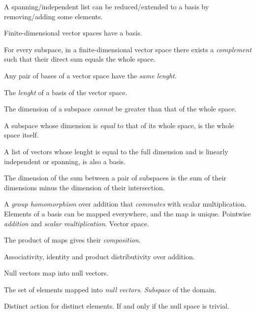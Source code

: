 \begin{multicols}{3}
  A spanning/independent list can be reduced/extended to a basis by removing/adding some elements.

  Finite-dimensional vector spaces have a basis.
  
  For every subspace, in a finite-dimensional vector space there exists a \textit{complement} such that their direct sum equals the whole space.
  
  Any pair of bases of a vector space have the \textit{same lenght}.
  
  The \textit{lenght} of a basis of the vector space.
  
  The dimension of a subspace \textit{cannot} be greater than that of the whole space.
  
  A subspace whose dimension is \textit{equal} to that of its whole space, is the whole space itself.
  
  A list of vectors whose lenght is equal to the full dimension and is linearly independent or spanning, is also a basis.
  
  The dimension of the sum between a pair of subspaces is the sum of their dimensions minus the dimension of their intersection.

  A \textit{group homomorphism} over addition that \textit{commutes} with scalar multiplication.
  Elements of a basis can be mapped everywhere, and the map is unique.
  Pointwise \textit{addition} and \textit{scalar multiplication}.
  Vector space.

  The product of maps gives their \textit{composition}.

  Associativity, identity and product distributivity over addition.

  Null vectors map into null vectors.

  The set of elements mapped into \textit{null vectors}.
  \textit{Subspace} of the domain.

  Distinct action for distinct elements.
  If and only if the null space is trivial.


\end{multicols}
